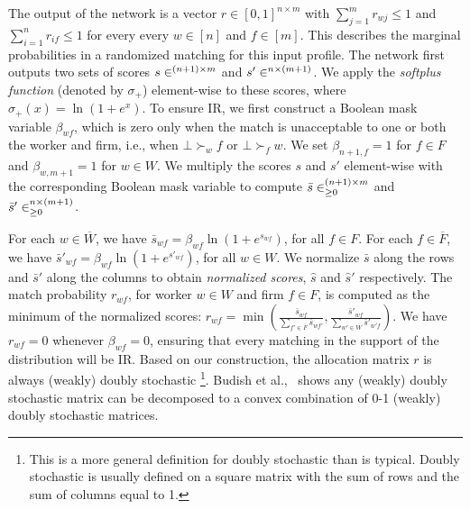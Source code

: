 \documentclass[11pt,letterpaper]{article}
\theoremstyle{definition}
\newcommand{\kibitz}[2]{\ifnum\Comments=1{\color{#1}{#2}}\fi}
\newcommand{\zf}[1]{\kibitz{blue}{[ZF: #1]}}
\newcommand{\dcp}[1]{\kibitz{orange}{[DCP: #1]}}
\let\R\relax
\newcommand*{\R}{\mathbb{R}}
\begin{document}

The output of the network is a vector $r \in [0, 1]^{n \times m}$ with  $\sum_{j = 1}^{m} r_{wj} \leq 1$ and 
$\sum_{i = 1}^{n} r_{if} \leq 1$  for every every $w \in [n]$ and $f \in [m]$. 
This describes the marginal probabilities in a randomized matching for this input profile. %
The network first outputs two sets of scores $s\in \R^{(n + 1) \times m}$ and $s' \in \R^{n \times (m + 1)}$.
%
We apply the {\em softplus function} (denoted by $\sigma_+$) element-wise to these scores, where $\sigma_+(x) = \ln (1 + e^{x})$. 
To ensure IR, we first construct a Boolean mask variable $\beta_{wf}$, which is zero only when the match is unacceptable to one or both the worker and firm, i.e., when $\bot \succ_{w} f$ or $\bot \succ_{f} w$. We set $\beta_{n+1, f} = 1$ for $f \in F$ and $\beta_{w, m+1} = 1$ for $w \in W$. We multiply the scores $s$ and $s'$ element-wise with the corresponding Boolean mask variable to compute $\bar s \in \R_{\geq 0}^{(n + 1) \times m}$ and $\bar s' \in \R_{\geq 0}^{n \times (m + 1)}$.

For each $w \in \overline{W}$, we have $\bar s_{wf} = \beta_{wf} \ln (1 + e^{s_{wf}})$, for all $f\in F$. For each  $f \in \overline{F}$, we have
   $\bar s'_{wf} = \beta_{wf} \ln (1 + e^{s'_{wf}})$,  for all $w \in W$.
%
We  normalize $\bar s$ along the rows and  $\bar s'$ along the columns to obtain {\em normalized scores}, $\hat s$ and $\hat s'$ respectively. The  match probability $r_{wf}$, for worker $w \in W$ and firm $f \in F$, is computed as the minimum of the normalized scores:
%
$r_{wf} = \min\left(\frac{\bar s_{wf}}{\sum_{f' \in \overline{F}} \bar s_{wf'}},  
\frac{\bar s'_{wf}}{\sum_{w' \in \overline{W}} \bar s'_{w'f}} \right)$.
%
We have $r_{wf} = 0$ whenever $\beta_{wf} = 0$, ensuring that every matching 
in the support of the distribution will be IR. 
Based on our construction, the allocation matrix $r$ is always (weakly) doubly stochastic \footnote{This is a more general definition for doubly stochastic than is typical. Doubly stochastic is usually defined on a
square matrix with the sum of rows and the sum of columns equal to 1.}. Budish et al.,~\cite{BCKM13} shows any (weakly) doubly stochastic matrix can be decomposed to a convex combination of 0-1 (weakly) doubly stochastic matrices. 

\end{document}
